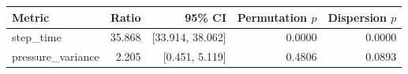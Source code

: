 \begin{tabular}{lrrrr}
\toprule
Metric & Ratio & 95\% CI & Permutation $p$ & Dispersion $p$ \\
\midrule
step\_time & 35.868 & [33.914, 38.062] & 0.0000 & 0.0000 \\
pressure\_variance & 2.205 & [0.451, 5.119] & 0.4806 & 0.0893 \\
\bottomrule
\end{tabular}

